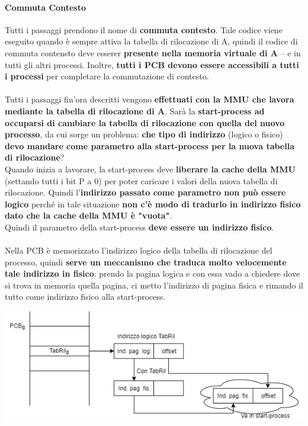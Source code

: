 \documentclass[10pt]{report}
\begin{document}
\paragraph{Commuta Contesto} Tutti i passaggi prendono il nome di \textbf{commuta contesto}. Tale codice viene eseguito quando è sempre attiva la tabella di rilocazione di A, quindi il codice di commuta contensto deve esserer \textbf{presente nella memoria virtuale di A} -- e in tutti gli altri processi. Inoltre, \textbf{tutti i PCB devono essere accessibili a tutti i processi} per completare la commutazione di contesto.\\\\
Tutti i passaggi fin'ora descritti vengono \textbf{effettuati con la MMU che lavora mediante la tabella di rilocazione di A}. Sarà la \textbf{start-process ad occuparsi di cambiare la tabella di rilocazione con quella del nuovo processo}, da cui sorge un problema: \textbf{che tipo di indirizzo} (logico o fisico) \textbf{devo mandare come parametro alla start-process per la nuova tabella di rilocazione}?\\
Quando inizia a lavorare, la start-process deve \textbf{liberare la cache della MMU} (settando tutti i bit P a 0) per poter caricare i valori della nuova tabella di rilocazione. Quindi l'\textbf{indirizzo passato come parametro non può essere logico} perché in tale situazione \textbf{non c'è modo di tradurlo in indirizzo fisico dato che la cache della MMU è "vuota"}.\\
Quindi il parametro della start-process \textbf{deve essere un indirizzo fisico}.\\\\
Nella PCB è memorizzato l'indirizzo logico della tabella di rilocazione del processo, quindi \textbf{serve un meccanismo che traduca molto velocemente tale indirizzo in fisico}: prendo la pagina logica e con essa vado a chiedere dove si trova in memoria quella pagina, ci metto l'indirizzo di pagina fisica e rimando il tutto come indirizzo fisico alla start-process.
\pagebreak
\begin{center}
	\includegraphics[scale=0.7]{commconttabril.png}
\end{center}
\end{document}

